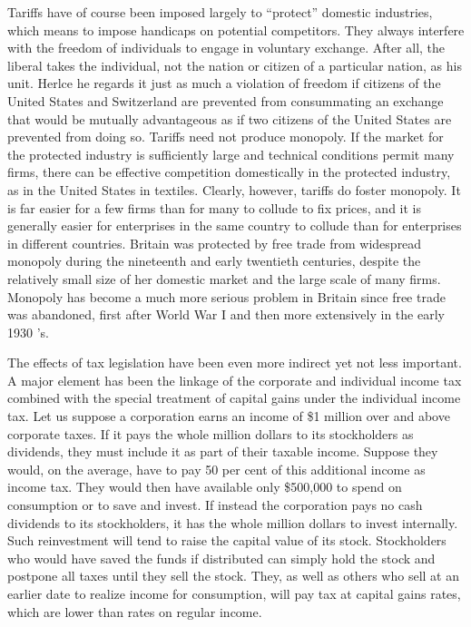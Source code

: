 \documentclass[11pt,openany]{book}
\begin{document}
Tariffs have of course been imposed largely to ``protect'' domestic industries, which means to impose handicaps on potential competitors. They always interfere with the freedom of individuals to engage in voluntary exchange. After all, the liberal takes the individual, not the nation or citizen of a particular nation, as his unit. Herlce he regards it just as much a violation of freedom if citizens of the United States and Switzerland are prevented from consummating an exchange that would be mutually advantageous as if two citizens of the United States are prevented from doing so. Tariffs need not produce monopoly. If the market for the protected industry is sufficiently large and technical conditions permit many firms, there can be effective competition domestically in the protected industry, as in the United States in textiles. Clearly, however, tariffs do foster monopoly. It is far easier for a few firms than for many to collude to fix prices, and it is generally easier for enterprises in the same country to collude than for enterprises in different countries. Britain was protected by free trade from widespread monopoly during the nineteenth and early twentieth centuries, despite the relatively small size of her domestic market and the large scale of many firms. Monopoly has become a much more serious problem in Britain since free trade was abandoned, first after World War I and then more extensively in the early 1930 's.

The effects of tax legislation have been even more indirect yet not less important. A major element has been the linkage of the corporate and individual income tax combined with the special treatment of capital gains under the individual income tax. Let us suppose a corporation earns an income of \$1 million over and above corporate taxes. If it pays the whole million dollars to its stockholders as dividends, they must include it as part of their taxable income. Suppose they would, on the average, have to pay 50 per cent of this additional income as income tax. They would then have available only \$500,000 to spend on consumption or to save and invest. If instead the corporation pays no cash dividends to its stockholders, it has the whole million dollars to invest internally. Such reinvestment will tend to raise the capital value of its stock. Stockholders who would have saved the funds if distributed can simply hold the stock and postpone all taxes until they sell the stock. They, as well as others who sell at an earlier date to realize income for consumption, will pay tax at capital gains rates, which are lower than rates on regular income.
\end{document}
